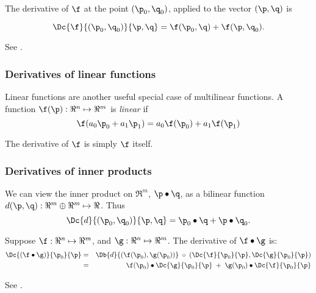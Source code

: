 The derivative of $\f$
at the point $(\p_0,\q_0)$, applied to the vector $(\p,\q)$ is

\begin{equation}
\Dc{\f}{(\p_0,\q_0)}{\p,\q} = \f(\p_0,\q) + \f(\p,\q_0).
\end{equation}

See \cite[ex. 2-12]{Spivak:1965:CalculusOnManifolds}.


\subsubsection{Derivatives of linear functions}
\label{sec:Derivatives-of-linear-functions}

Linear functions are another useful special case of multilinear functions.
A function $\f(\p):\Re^{n} \mapsto \Re^m$
is {\it linear} if
\begin{equation}
\f(a_0 \p_0 + a_1 \p_1)
 =
a_0 \f(\p_0) + a_1 \f(\p_1)
\end{equation}

The derivative of $\f$ is simply $\f$ itself.


\subsubsection{Derivatives of inner products}
\label{sec:inner}

We can view the inner product on $\Re^m$, $\p \bullet \q$,
as a bilinear function $d(\p,\q) : \Re^m \oplus \Re^m \mapsto \Re$.
Thus
\begin{equation}
\Dc{d}{(\p_0,\q_0)}{\p,\q} = \p_0 \bullet \q + \p \bullet \q_0.
\end{equation}

Suppose
$\f:\Re^{n} \mapsto \Re^{m}$, and
$\g:\Re^{n} \mapsto \Re^{m}$.
The derivative of $\f \bullet \g$ is:
\begin{eqnarray}
\label{eq:dot_derivative}
\Dc{(\f \bullet \g)}{\p_0}{\p}
& =
& \Db{d}{(\f(\p_0),\g(\p_0))} \;\circ \;(\Dc{\f}{\p_0}{\p}, \Dc{\g}{\p_0}{\p})
\\
& =
& \f(\p_0) \bullet \Dc{\g}{\p_0}{\p} \; + \; \g(\p_0) \bullet \Dc{\f}{\p_0}{\p} \nonumber
\end{eqnarray}

See \cite[ex.~2-13]{Spivak:1965:CalculusOnManifolds}.


